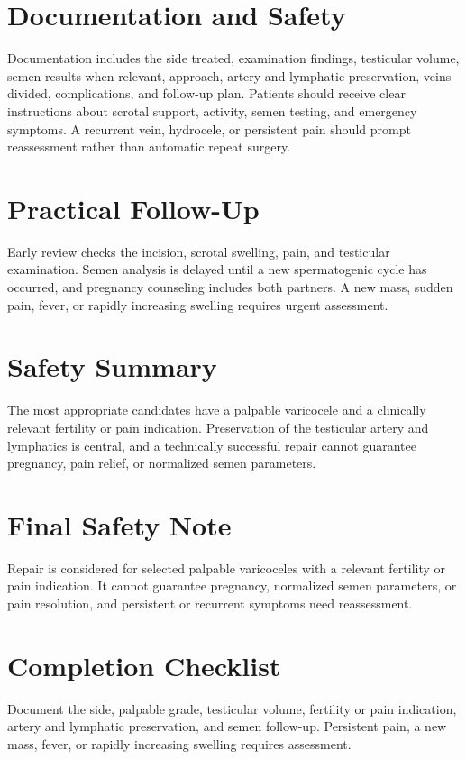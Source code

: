 \section*{Documentation and Safety}
Documentation includes the side treated, examination findings, testicular volume, semen results when relevant, approach, artery and lymphatic preservation, veins divided, complications, and follow-up plan. Patients should receive clear instructions about scrotal support, activity, semen testing, and emergency symptoms. A recurrent vein, hydrocele, or persistent pain should prompt reassessment rather than automatic repeat surgery.

\section*{Practical Follow-Up}
Early review checks the incision, scrotal swelling, pain, and testicular examination. Semen analysis is delayed until a new spermatogenic cycle has occurred, and pregnancy counseling includes both partners. A new mass, sudden pain, fever, or rapidly increasing swelling requires urgent assessment.

\section*{Safety Summary}
The most appropriate candidates have a palpable varicocele and a clinically relevant fertility or pain indication. Preservation of the testicular artery and lymphatics is central, and a technically successful repair cannot guarantee pregnancy, pain relief, or normalized semen parameters.

\section*{Final Safety Note}
Repair is considered for selected palpable varicoceles with a relevant fertility or pain indication. It cannot guarantee pregnancy, normalized semen parameters, or pain resolution, and persistent or recurrent symptoms need reassessment.

\section*{Completion Checklist}
Document the side, palpable grade, testicular volume, fertility or pain indication, artery and lymphatic preservation, and semen follow-up. Persistent pain, a new mass, fever, or rapidly increasing swelling requires assessment.

